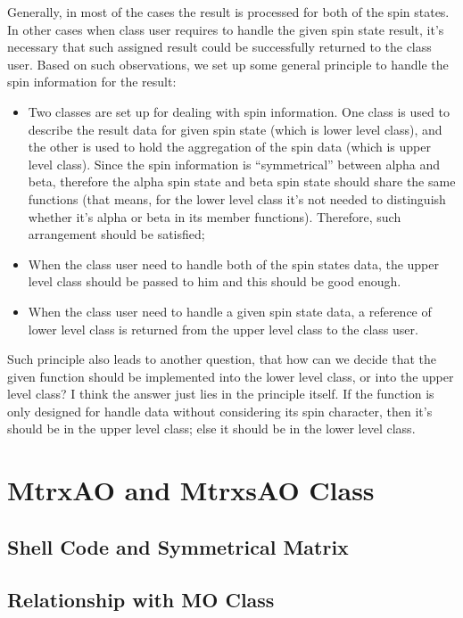 Generally, in most of the cases the result is processed for both of the spin 
states. In other cases when class user requires to handle the given spin
state result, it's necessary that such assigned result could be successfully
returned to the class user. Based on such observations, we set up some general
principle to handle the spin information for the result:
\begin{itemize}
  \item Two classes are set up for dealing with spin information. One class is
  used to describe the result data for given spin state (which is lower level
  class), and the other is used to hold the aggregation of the spin data (which
  is upper level class). Since the spin information is ``symmetrical'' between
  alpha and beta, therefore the alpha spin state and beta spin state should share
  the same functions (that means, for the lower level class it's not needed to
  distinguish whether it's alpha or beta in its member functions). Therefore,
  such arrangement should be satisfied;
  \item When the class user need to handle both of the spin states data, the 
  upper level class should be passed to him and this should be good enough. 
  \item When the class user need to handle a given spin state data, a reference
  of lower level class is returned from the upper level class to the class user. 
\end{itemize}

Such principle also leads to another question, that how can we decide that 
the given function should be implemented into the lower level class, or 
into the upper level class? I think the answer just lies in the principle itself.
If the function is only designed for handle data without considering its 
spin character, then it's should be in the upper level class; else it should 
be in the lower level class.

\section{MtrxAO and MtrxsAO Class}
%
%

\subsection{Shell Code and Symmetrical Matrix}
%
%

\subsection{Relationship with MO Class}
%
%

